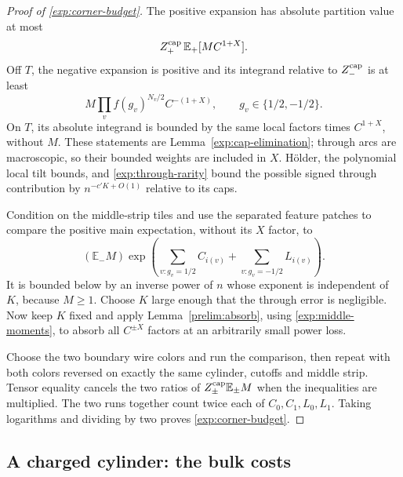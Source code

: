 \begin{proof}[Proof of \eqref{exp:corner-budget}]
The positive expansion has absolute partition value at most
\[
 Z_+^{\rm cap}\,\mathbb E_+[M C^{1+X}].
\]
Off $T$, the negative expansion is positive and its integrand relative
to $Z_-^{\rm cap}$ is at least
\[
 M\prod_v f(g_v)^{N_v/2}C^{-(1+X)},
 \qquad g_v\in\{1/2,-1/2\}.
\]
On $T$, its absolute integrand is bounded by the same local factors
times $C^{1+X}$, without $M$. These statements are
Lemma~\ref{exp:cap-elimination}; through arcs are macroscopic, so their
bounded weights are included in $X$. H\"older, the polynomial local
tilt bounds, and \eqref{exp:through-rarity} bound the possible signed
through contribution by $n^{-c'K+O(1)}$ relative to its caps.

Condition on the middle-strip tiles and use the separated feature
patches to compare the positive main expectation, without its $X$
factor, to
\[
 (\mathbb E_-M)
 \exp\left(\sum_{v:g_v=1/2}C_{i(v)}+
           \sum_{v:g_v=-1/2}L_{i(v)}\right).
\]
It is bounded below by an inverse power of $n$ whose exponent is
independent of $K$, because $M\ge1$. Choose $K$ large enough that the
through error is negligible. Now keep $K$ fixed and apply
Lemma~\ref{prelim:absorb}, using \eqref{exp:middle-moments}, to absorb
all $C^{\pm X}$ factors at an arbitrarily small power loss.

Choose the two boundary wire colors and run the comparison, then
repeat with both colors reversed on exactly the same cylinder, cutoffs and
middle strip. Tensor equality cancels the two ratios of
$Z_\pm^{\rm cap}\mathbb E_\pm M$ when the inequalities are multiplied.
The two runs together count twice each of $C_0,C_1,L_0,L_1$.
Taking logarithms and dividing by two proves
\eqref{exp:corner-budget}.
\end{proof}

\subsection{A charged cylinder: the bulk costs}

